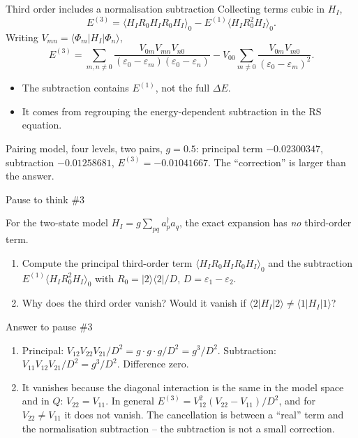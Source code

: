 \documentclass[aspectratio=169,10pt]{beamer}
\newcounter{thinkctr}
\newcommand{\thinkq}[2]{%
  \stepcounter{thinkctr}%
  \vfill
  \begin{tcolorbox}[enhanced,colback=palewarm,colframe=warm,boxrule=1.2pt,arc=4pt,
    grow to left by=6mm,grow to right by=6mm,
    left=16pt,right=16pt,top=16pt,bottom=18pt,
    fonttitle=\bfseries\Large,fontupper=\Large,
    title={Pause to think \#\thethinkctr\hfill\mdseries\normalsize(about #1 min -- discuss with your neighbour)}]
  #2
  \end{tcolorbox}
  \vfill}
\newcommand{\thinka}[1]{%
  \vfill
  \begin{tcolorbox}[enhanced,colback=paleteal,colframe=teal,boxrule=1.2pt,arc=4pt,
    grow to left by=6mm,grow to right by=6mm,
    left=16pt,right=16pt,top=16pt,bottom=18pt,
    fonttitle=\bfseries\Large,fontupper=\large,
    title={Answer to pause \#\thethinkctr}]
  #1
  \end{tcolorbox}
  \vfill}
\newcommand{\numbox}[1]{%
  \begin{tcolorbox}[colback=palegreen,colframe=teal!70!black,title={\bfseries Measured}]
  #1
  \end{tcolorbox}}
\newcommand{\ket}[1]{\vert #1\rangle}
\newcommand{\bra}[1]{\langle #1\vert}
\newcommand{\mel}[3]{\langle #1\lvert #2\rvert #3\rangle}
\newcommand{\av}[1]{\langle #1\rangle_0}
\newcommand{\cre}[1]{a_{#1}^{\dagger}}
\newcommand{\ann}[1]{a_{#1}}
\begin{document}
\begin{frame}{Third order includes a normalisation subtraction}
Collecting terms cubic in \(H_I\),
\[
\boxed{E^{(3)}=
\av{H_I R_0H_I R_0H_I}
-E^{(1)}\av{H_I R_0^2H_I}.}
\]
Writing \(V_{mn}=\mel{\Phi_m}{H_I}{\Phi_n}\),
\[
E^{(3)}=\sum_{m,n\ne0}
\frac{V_{0m}V_{mn}V_{n0}}
 {(\varepsilon_0-\varepsilon_m)(\varepsilon_0-\varepsilon_n)}
-V_{00}\sum_{m\ne0}
\frac{V_{0m}V_{m0}}{(\varepsilon_0-\varepsilon_m)^2}.
\]
\begin{itemize}
\item The subtraction contains \(E^{(1)}\), not the full \(\Delta E\).
\item It comes from regrouping the energy-dependent subtraction in the RS equation.
\end{itemize}
\numbox{Pairing model, four levels, two pairs, \(g=0.5\): principal term \(-0.02300347\), subtraction \(-0.01258681\), \(E^{(3)}=-0.01041667\). The ``correction'' is larger than the answer.}
\end{frame}

\begin{frame}{Pause to think \#3}
\thinkq{4}{For the two-state model \(H_I=g\sum_{pq}\cre{p}\ann{q}\), the exact expansion has \emph{no} third-order term.
\begin{enumerate}
\item Compute the principal third-order term \(\av{H_IR_0H_IR_0H_I}\) and the subtraction \(E^{(1)}\av{H_IR_0^2H_I}\) with \(R_0=\ket{2}\bra{2}/D\), \(D=\varepsilon_1-\varepsilon_2\).
\item Why does the third order vanish? Would it vanish if \(\mel{2}{H_I}{2}\ne\mel{1}{H_I}{1}\)?
\end{enumerate}}
\end{frame}

\begin{frame}{Answer to pause \#3}
\thinka{%
\begin{enumerate}
\item Principal: \(V_{12}V_{22}V_{21}/D^2=g\cdot g\cdot g/D^2=g^3/D^2\). Subtraction: \(V_{11}V_{12}V_{21}/D^2=g^3/D^2\). Difference zero.
\item It vanishes because the diagonal interaction is the same in the model space and in \(Q\): \(V_{22}=V_{11}\). In general \(E^{(3)}=V_{12}^2(V_{22}-V_{11})/D^2\), and for \(V_{22}\ne V_{11}\) it does not vanish. The cancellation is between a ``real'' term and the normalisation subtraction -- the subtraction is not a small correction.
\end{enumerate}}
\end{frame}
\end{document}
